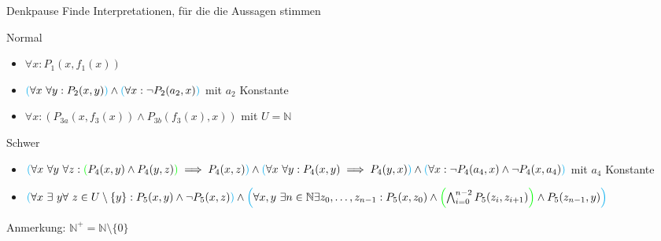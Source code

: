 {
\begin{frame}{Denkpause}
	Finde Interpretationen, für die die Aussagen stimmen
	\begin{block}{Normal}
		\begin{itemize}
			\item $\forall x: {P_1(x,f_1(x))}$
			\item $\cleft[cyan](\forall x\ \forall y : P_2(x,y)\cright[cyan])
				      \land \cleft[cyan](\forall x : \lnot P_2(a_2,x)\cright[cyan])$ mit $a_2$ Konstante
			\item $\forall x : \left(P_{3a}(x,f_3(x))\land P_{3b}(f_3(x),x)\right)$ mit $U=\mathbb{N}$ %
		\end{itemize}
	\end{block}
	\begin{block}{Schwer}
		\begin{itemize}
			\item $\cleft[cyan](
				      \forall x\ \forall y\ \forall z :
				      \cleft[green](
				      P_4(x,y) \land P_4(y,z)
				      \cright[green])
				      \implies P_4(x,z)
				      \cright[cyan])
				      \land
				      \cleft[cyan](
				      \forall x\ \forall y : P_4(x,y) \implies P_4(y,x)
				      \cright[cyan])
				      \land
				      \cleft[cyan](
				      \forall x : \lnot P_4(a_4, x) \land \lnot P_4(x, a_4)
				      \cright[cyan])$
			      mit $a_4$ Konstante
			\item $\cleft[cyan](
				      \forall x\ \exists\ y \forall\ z \in U\setminus\{y\} : P_5(x,y)\land\lnot P_5(x,z)
				      \cright[cyan])
				      \land
				      \cleft[cyan](
				      \forall x,y\ \exists n\in \mathbb{N} \exists z_0,\dots,z_{n-1} : P_5(x,z_0) \land
				      \cleft[green](
				      \bigwedge_{i=0}^{n-2} P_5(z_i,z_{i+1})
				      \cright[green])
				      \land P_5(z_{n-1},y)
				      \cright[cyan])$
		\end{itemize}
	\end{block}
	\alert{Anmerkung:} $\mathbb{N}^+ = \mathbb{N} \setminus \{0\}$
\end{frame}

}
